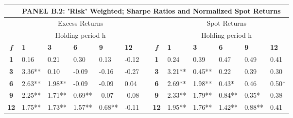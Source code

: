 \documentclass{article}
\begin{document}
\begin{table}[htbp!]
\begin{adjustwidth}{-2cm}{}
\begin{tabular}{ccccccccccccc}
    \midrule
          & \multicolumn{12}{l}{PANEL B.2: 'Risk' Weighted; Sharpe Ratios and Normalized Spot Returns} \\
    \midrule
          & \multicolumn{5}{c}{Excess Returns}    &       &       & \multicolumn{5}{c}{Spot Returns} \\
\cmidrule{2-6}\cmidrule{9-13}          & \multicolumn{5}{c}{Holding period h}  &       &       & \multicolumn{5}{c}{Holding period h} \\
    \textit{\textbf{f}} & \multicolumn{1}{l}{\textbf{1}} & \multicolumn{1}{l}{\textbf{3}} & \multicolumn{1}{l}{\textbf{6}} & \multicolumn{1}{l}{\textbf{9}} & \multicolumn{1}{l}{\textbf{12}} &       & \textit{\textbf{f}} & \multicolumn{1}{l}{\textbf{1}} & \multicolumn{1}{l}{\textbf{3}} & \multicolumn{1}{l}{\textbf{6}} & \multicolumn{1}{l}{\textbf{9}} & \multicolumn{1}{l}{\textbf{12}} \\
\cmidrule{2-6}\cmidrule{9-13}    \textbf{1} & \multicolumn{1}{l}{0.16} & \multicolumn{1}{l}{0.21} & \multicolumn{1}{l}{0.30} & \multicolumn{1}{l}{0.13} & \multicolumn{1}{l}{-0.12} &       & \textbf{1} & \multicolumn{1}{l}{0.24} & \multicolumn{1}{l}{0.39} & \multicolumn{1}{l}{0.47} & \multicolumn{1}{l}{0.49} & \multicolumn{1}{l}{0.41} \\
    \textbf{3} & \multicolumn{1}{l}{3.36**} & \multicolumn{1}{l}{0.10} & \multicolumn{1}{l}{-0.09} & \multicolumn{1}{l}{-0.16} & \multicolumn{1}{l}{-0.27} &       & \textbf{3} & \multicolumn{1}{l}{3.21**} & \multicolumn{1}{l}{0.45**} & \multicolumn{1}{l}{0.22} & \multicolumn{1}{l}{0.39} & \multicolumn{1}{l}{0.30} \\
    \textbf{6} & \multicolumn{1}{l}{2.63**} & \multicolumn{1}{l}{1.98**} & \multicolumn{1}{l}{-0.09} & \multicolumn{1}{l}{-0.09} & \multicolumn{1}{l}{0.04} &       & \textbf{6} & \multicolumn{1}{l}{2.69**} & \multicolumn{1}{l}{1.98**} & \multicolumn{1}{l}{0.43*} & \multicolumn{1}{l}{0.46} & \multicolumn{1}{l}{0.50*} \\
    \textbf{9} & \multicolumn{1}{l}{2.25**} & \multicolumn{1}{l}{1.71**} & \multicolumn{1}{l}{0.69**} & \multicolumn{1}{l}{-0.07} & \multicolumn{1}{l}{-0.08} &       & \textbf{9} & \multicolumn{1}{l}{2.33**} & \multicolumn{1}{l}{1.79**} & \multicolumn{1}{l}{0.84**} & \multicolumn{1}{l}{0.35*} & \multicolumn{1}{l}{0.38} \\
    \textbf{12} & \multicolumn{1}{l}{1.75**} & \multicolumn{1}{l}{1.73**} & \multicolumn{1}{l}{1.57**} & \multicolumn{1}{l}{0.68**} & \multicolumn{1}{l}{-0.11} &       & \textbf{12} & \multicolumn{1}{l}{1.95**} & \multicolumn{1}{l}{1.76**} & \multicolumn{1}{l}{1.42**} & \multicolumn{1}{l}{0.88**} & \multicolumn{1}{l}{0.41} \\

\end{tabular}
\end{adjustwidth}
\end{table}
\end{document}
